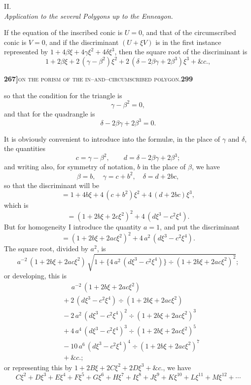 \documentclass[11pt]{article}
\begin{document}
\medskip

\begin{center}\textsc{II.}\\[0.3em]\textit{Application to the several Polygons up to the Enneagon.}\end{center}

\medskip

\noindent If the equation of the inscribed conic is $U = 0$, and that of the circumscribed conic is $V = 0$, and if the discriminant $(U + \xi V)$ is in the first instance represented by $1 + 4\beta\xi + 4\gamma\xi^2 + 4\delta\xi^3$, then the square root of the discriminant is
\[
   1 + 2\beta\xi + 2\,(\gamma - \beta^2)\xi^2 + 2\,(\delta - 2\beta\gamma + 2\beta^3)\xi^3 + \&c.,
\]

\newpage
\setcounter{page}{299}

\noindent\textbf{267]}\hfill\textsc{on the porism of the in--and--circumscribed polygon.}\hfill\textbf{299}

\medskip

\noindent so that the condition for the triangle is
\[
   \gamma - \beta^2 = 0,
\]
and that for the quadrangle is
\[
   \delta - 2\beta\gamma + 2\beta^3 = 0.
\]

\medskip

\noindent It is obviously convenient to introduce into the formul\ae, in the place of $\gamma$ and $\delta$, the quantities
\[
   c = \gamma - \beta^2,\qquad d = \delta - 2\beta\gamma + 2\beta^3;
\]
and writing also, for symmetry of notation, $b$ in the place of $\beta$, we have
\[
   \beta = b,\quad \gamma = c + b^2,\quad \delta = d + 2 b c,
\]
so that the discriminant will be
\[
   = 1 + 4 b\xi + 4\,(c + b^2)\xi^2 + 4\,(d + 2 b c)\xi^3,
\]
which is
\[
   = (1 + 2 b\xi + 2 c\xi^2)^2 + 4\,(d\xi^3 - c^2\xi^4).
\]
But for homogeneity I introduce the quantity $a = 1$, and put the discriminant
\[
   = (1 + 2 b\xi + 2 a c\xi^2)^2 + 4\,a^2\,(d\xi^3 - c^2\xi^4).
\]
The square root, divided by $a^2$, is
\[
   a^{-2}\,(1 + 2 b\xi + 2 a c\xi^2)\,\sqrt{1 + \bigl\{4\,a^2\,(d\xi^3 - c^2\xi^4)\bigr\}\div(1 + 2 b\xi + 2 a c\xi^2)^2};
\]
or developing, this is
\[
\begin{aligned}
   &\phantom{={}} a^{-2}\,(1 + 2 b\xi + 2 a c\xi^2)\\
   &{} + 2\,(d\xi^3 - c^2\xi^4)\div(1 + 2 b\xi + 2 a c\xi^2)\\
   &{} - 2\,a^2\,(d\xi^3 - c^2\xi^4)^2 \div (1 + 2 b\xi + 2 a c\xi^2)^3\\
   &{} + 4\,a^4\,(d\xi^3 - c^2\xi^4)^3\div(1 + 2 b\xi + 2 a c\xi^2)^5\\
   &{} - 10\,a^6\,(d\xi^3 - c^2\xi^4)^4\div(1 + 2 b\xi + 2 a c\xi^2)^7\\
   &{} + \&c.;
\end{aligned}
\]
or representing this by $1 + 2 B\xi + 2 C\xi^2 + 2 D\xi^3 + \&c.$, we have
\[
   C\xi^2 + D\xi^3 + E\xi^4 + F\xi^5 + G\xi^6 + H\xi^7 + I\xi^8 + J\xi^9 + K\xi^{10} + L\xi^{11} + M\xi^{12} + \cdots
\]
\end{document}
